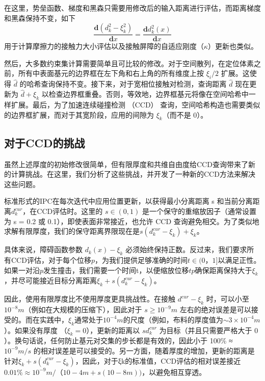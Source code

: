 在这里，势垒函数、梯度和黑森只需要用修改后的输入距离进行评估，而距离梯度和黑森保持不变，如下
\begin{equation}
  \frac{\mathbf d(d_k^2 - \xi_k^2)}{\mathbf dx} = \frac{\mathbf d d_k^2(x)}{\mathbf d x}
\end{equation}
用于计算摩擦力的接触力大小评估以及接触屏障的自适应刚度（$\kappa$）更新也类似。

然后，大多数约束集计算需要简单且可比较的修改。对于空间散列，在定位体素之前，所有中表面基元的边界框在左下角和右上角的所有维度上按 $\xi_i/2$ 扩展。这使得 $\hat d$ 的哈希查询保持不变。接下来，对于宽相位接触对检测，查询距离 $\hat d$ 现在更新为 $\hat d + \xi_k$ 以检查边界框重叠。否则，等效地，边界框基元将像在空间哈希中一样扩展。最后，为了加速连续碰撞检测 （CCD） 查询，空间哈希构造也需要类似的边界框扩展，而对于其宽阶段，应用的间隙为 $\xi_k$（而不是 0）。

\subsection{对于CCD的挑战}

虽然上述厚度的初始修改很简单，但有限厚度和共维自由度给CCD查询带来了新的计算挑战。在这里，我们分析了这些挑战，并开发了一种新的CCD方法来解决这些问题。

标准形式的IPC在每次迭代中应用位置更新，以获得最小分离距离 s 和当前分离距离$d_k^{cur}$，在CCD评估时。这里的 $s \in(0, 1)$ 是一个保守的重缩放因子（通常设置为 s = 0.2 或 0.1），即使表面非常接近，也允许 CCD 查询避免相交。为了类似地求解有限厚度，我们的保守距离界限现在是$s(d_k^{cur} − \xi_k) + \xi_k$。

具体来说，障碍函数参数 $d_k(x) − \xi_k$ 必须始终保持正数。反过来，我们要求所有CCD评估，对于每个位移$p$，为我们提供足够准确的时间$t \in(0，1]$以满足正性。如果一对沿$p$发生撞击，我们需要一个时间t，以便缩放位移$tp$确保距离保持大于$\xi_k$，并尽可能接近目标分离距离$\xi_k + s(d_k^{cur} − \xi_k)$。

因此，使用有限厚度比不使用厚度更具挑战性。在接触 $d^{cur} − \xi_k$ 时，可以小至 $10^{−8 }m$（例如在大规模的压缩下），因此对于 $s\ge 10 ^{−9} m$ 左右的绝对误差是可以接受的。而在实践中，$\xi_k$通常处于$10^{−4} m$的尺度（例如，布料的厚度值为$\sim 3 \times 10^{−4}m$）。如果没有厚度 （$\xi_k = 0$），更新的距离以 $sd_k^{cur}$ 为目标（并且只需要严格大于 $0$）。换句话说，任何防止基元对交集的步长都是有效的，因此小于 100\% ≈ $10^{−9} m/s$ 的相对误差是可以接受的。另一方面，随着厚度的增加，更新的距离是针对$\xi_k + s(d_k^{cur} − \xi_k)$，因此，对于ξk的标准值，CCD评估的相对误差接近$0.01\%\approx 10^{ −9} m/（10 -4 m + s(10 −8 m))$，以避免相互穿透。

